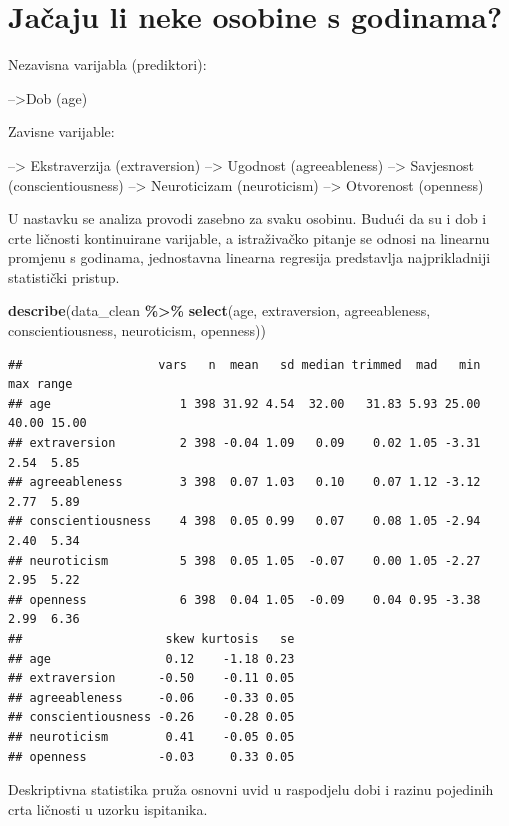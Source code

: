 \documentclass[
]{article}
\newenvironment{Shaded}{\begin{snugshade}}{\end{snugshade}}
\newcommand{\FunctionTok}[1]{\textcolor[rgb]{0.13,0.29,0.53}{\textbf{#1}}}
\newcommand{\NormalTok}[1]{#1}
\newcommand{\SpecialCharTok}[1]{\textcolor[rgb]{0.81,0.36,0.00}{\textbf{#1}}}
\begin{document}
\section{Jačaju li neke osobine s
godinama?}\label{jaux10daju-li-neke-osobine-s-godinama}

Nezavisna varijabla (prediktori):

--\textgreater Dob (age)

Zavisne varijable:

--\textgreater{} Ekstraverzija (extraversion) --\textgreater{} Ugodnost
(agreeableness) --\textgreater{} Savjesnost (conscientiousness)
--\textgreater{} Neuroticizam (neuroticism) --\textgreater{} Otvorenost
(openness)

U nastavku se analiza provodi zasebno za svaku osobinu. Budući da su i
dob i crte ličnosti kontinuirane varijable, a istraživačko pitanje se
odnosi na linearnu promjenu s godinama, jednostavna linearna regresija
predstavlja najprikladniji statistički pristup.

\begin{Shaded}
\begin{Highlighting}[]
\FunctionTok{describe}\NormalTok{(data\_clean }\SpecialCharTok{\%\textgreater{}\%}
  \FunctionTok{select}\NormalTok{(age, extraversion, agreeableness,}
\NormalTok{         conscientiousness, neuroticism, openness))}
\end{Highlighting}
\end{Shaded}

\begin{verbatim}
##                   vars   n  mean   sd median trimmed  mad   min   max range
## age                  1 398 31.92 4.54  32.00   31.83 5.93 25.00 40.00 15.00
## extraversion         2 398 -0.04 1.09   0.09    0.02 1.05 -3.31  2.54  5.85
## agreeableness        3 398  0.07 1.03   0.10    0.07 1.12 -3.12  2.77  5.89
## conscientiousness    4 398  0.05 0.99   0.07    0.08 1.05 -2.94  2.40  5.34
## neuroticism          5 398  0.05 1.05  -0.07    0.00 1.05 -2.27  2.95  5.22
## openness             6 398  0.04 1.05  -0.09    0.04 0.95 -3.38  2.99  6.36
##                    skew kurtosis   se
## age                0.12    -1.18 0.23
## extraversion      -0.50    -0.11 0.05
## agreeableness     -0.06    -0.33 0.05
## conscientiousness -0.26    -0.28 0.05
## neuroticism        0.41    -0.05 0.05
## openness          -0.03     0.33 0.05
\end{verbatim}

Deskriptivna statistika pruža osnovni uvid u raspodjelu dobi i razinu
pojedinih crta ličnosti u uzorku ispitanika.
\end{document}
